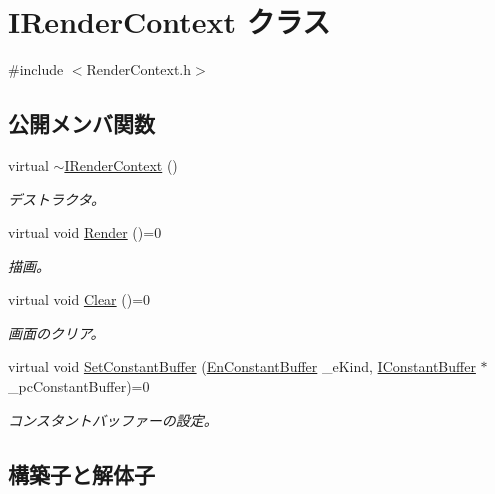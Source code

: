 \hypertarget{class_i_render_context}{}\section{I\+Render\+Context クラス}
\label{class_i_render_context}


{\ttfamily \#include $<$Render\+Context.\+h$>$}

\subsection*{公開メンバ関数}
\begin{DoxyCompactItemize}
\item 
virtual \hyperlink{class_i_render_context_a1c20807e9f3706873a9d7f49bf4fe43f}{$\sim$\+I\+Render\+Context} ()
\begin{DoxyCompactList}\small\item\em デストラクタ。 \end{DoxyCompactList}\item 
virtual void \hyperlink{class_i_render_context_a4e2185c38b1599cf94f52c99d2a8b9fc}{Render} ()=0
\begin{DoxyCompactList}\small\item\em 描画。 \end{DoxyCompactList}\item 
virtual void \hyperlink{class_i_render_context_af39a3637d8844d1728ea7363673525d6}{Clear} ()=0
\begin{DoxyCompactList}\small\item\em 画面のクリア。 \end{DoxyCompactList}\item 
virtual void \hyperlink{class_i_render_context_acab012460a88d3d4df1115fcbd0d553e}{Set\+Constant\+Buffer} (\hyperlink{_constant_buffer_8h_aaf416c55b2e43195b9cf771071e1328a}{En\+Constant\+Buffer} \+\_\+e\+Kind, \hyperlink{class_i_constant_buffer}{I\+Constant\+Buffer} $\ast$\+\_\+pc\+Constant\+Buffer)=0
\begin{DoxyCompactList}\small\item\em コンスタントバッファーの設定。 \end{DoxyCompactList}\end{DoxyCompactItemize}


\subsection{構築子と解体子}
\hypertarget{class_i_render_context_a1c20807e9f3706873a9d7f49bf4fe43f}{}

